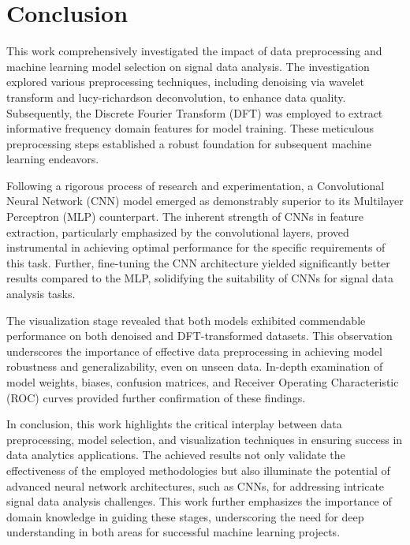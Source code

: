 \section{Conclusion}\label{conclusion}

This work comprehensively investigated the impact of data preprocessing and machine learning model selection on signal data analysis. The investigation explored various preprocessing techniques, including denoising via wavelet transform and lucy-richardson deconvolution, to enhance data quality. Subsequently, the Discrete Fourier Transform (DFT) was employed to extract informative frequency domain features for model training. These meticulous preprocessing steps established a robust foundation for subsequent machine learning endeavors.

Following a rigorous process of research and experimentation, a Convolutional Neural Network (CNN) model emerged as demonstrably superior to its Multilayer Perceptron (MLP) counterpart. The inherent strength of CNNs in feature extraction, particularly emphasized by the convolutional layers, proved instrumental in achieving optimal performance for the specific requirements of this task. Further, fine-tuning the CNN architecture yielded significantly better results compared to the MLP, solidifying the suitability of CNNs for signal data analysis tasks.

The visualization stage revealed that both models exhibited commendable performance on both denoised and DFT-transformed datasets. This observation underscores the importance of effective data preprocessing in achieving model robustness and generalizability, even on unseen data. In-depth examination of model weights, biases, confusion matrices, and Receiver Operating Characteristic (ROC) curves provided further confirmation of these findings.

In conclusion, this work highlights the critical interplay between data preprocessing, model selection, and visualization techniques in ensuring success in data analytics applications. The achieved results not only validate the effectiveness of the employed methodologies but also illuminate the potential of advanced neural network architectures, such as CNNs, for addressing intricate signal data analysis challenges. This work further emphasizes the importance of domain knowledge in guiding these stages, underscoring the need for deep understanding in both areas for successful machine learning projects.


